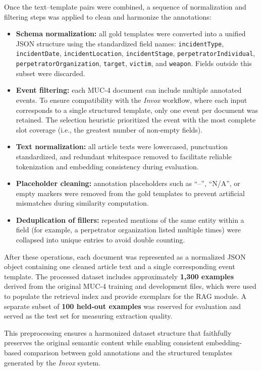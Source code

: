 Once the text–template pairs were combined, a sequence of normalization and filtering steps was applied to clean and harmonize the annotations:

\begin{itemize}
    \item \textbf{Schema normalization:} all gold templates were converted into a unified JSON structure using the standardized field names: \texttt{incidentType}, \texttt{incidentDate}, \texttt{incidentLocation}, \texttt{incidentStage}, \texttt{perpetratorIndividual}, \texttt{perpetratorOrganization}, \texttt{target}, \texttt{victim}, and \texttt{weapon}. Fields outside this subset were discarded.
    \item \textbf{Event filtering:} each MUC-4 document can include multiple annotated events. To ensure compatibility with the \textit{Invox} workflow, where each input corresponds to a single structured template, only one event per document was retained. The selection heuristic prioritized the event with the most complete slot coverage (i.e., the greatest number of non-empty fields).
    \item \textbf{Text normalization:} all article texts were lowercased, punctuation standardized, and redundant whitespace removed to facilitate reliable tokenization and embedding consistency during evaluation.
    \item \textbf{Placeholder cleaning:} annotation placeholders such as ``--'', ``N/A'', or empty markers were removed from the gold templates to prevent artificial mismatches during similarity computation.
    \item \textbf{Deduplication of fillers:} repeated mentions of the same entity within a field (for example, a perpetrator organization listed multiple times) were collapsed into unique entries to avoid double counting.
\end{itemize}

After these operations, each document was represented as a normalized JSON object containing one cleaned article text and a single corresponding event template. The processed dataset includes approximately \textbf{1,300 examples} derived from the original MUC-4 training and development files, which were used to populate the retrieval index and provide exemplars for the RAG module. A separate subset of \textbf{100 held-out examples} was reserved for evaluation and served as the test set for measuring extraction quality. 

This preprocessing ensures a harmonized dataset structure that faithfully preserves the original semantic content while enabling consistent embedding-based comparison between gold annotations and the structured templates generated by the \textit{Invox} system.


